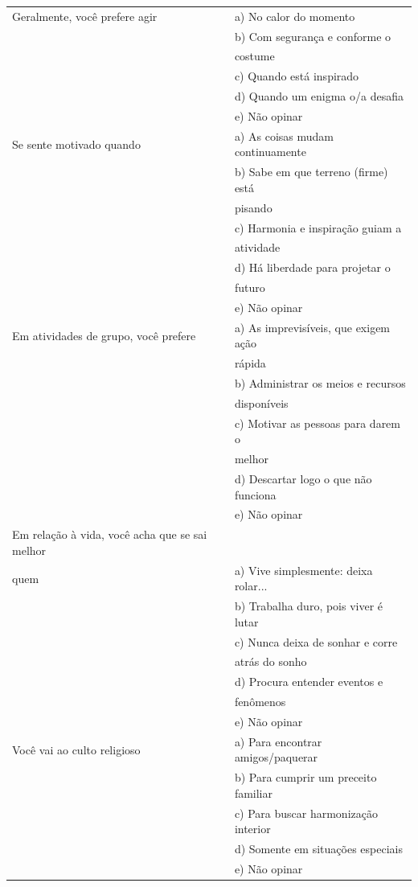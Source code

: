 \documentclass[
	12pt,				%
    oneside,			%
	a4paper,			%
	english,			%
	french,				%
	spanish,			%
	brazil,				%
	]{abntex2}
\begin{document}
\begin{apendicesenv}
\begin{center}
\begin{longtable}{l|l}
    Geralmente, você prefere agir & a) No calor do momento\\ & b) Com segurança e conforme o \\ & costume\\ & c) Quando está inspirado\\ & d) Quando um enigma o/a desafia\\ & e) Não opinar                                  \\ \hline
    Se sente motivado quando & a) As coisas mudam continuamente\\ & b) Sabe em que terreno (firme) está \\ & pisando\\ & c) Harmonia e inspiração guiam a \\ & atividade\\ & d) Há liberdade para projetar o \\ & futuro\\ & e) Não opinar
    \\ \hline
    Em atividades de grupo, você prefere & a) As imprevisíveis, que exigem ação \\ & rápida\\ & b) Administrar os meios e recursos\\ & disponíveis\\ & c) Motivar as pessoas para darem o \\ & melhor\\ & d) Descartar logo o que não funciona\\ & e) Não opinar
    \\ \hline
    Em relação à vida, você acha que se sai melhor \\ quem & a) Vive simplesmente: deixa rolar...\\ & b) Trabalha duro, pois viver é lutar\\ & c) Nunca deixa de sonhar e corre \\ & atrás do sonho\\ & d) Procura entender eventos e \\ & fenômenos\\ & e) Não opinar
    \\ \hline
    Você vai ao culto religioso & a) Para encontrar amigos/paquerar\\ &  b) Para cumprir um preceito familiar\\ & c) Para buscar harmonização interior\\ & d) Somente em situações especiais\\ & e) Não opinar
    \\ \hline

\end{longtable}
\end{center}
\end{apendicesenv}
\end{document}
